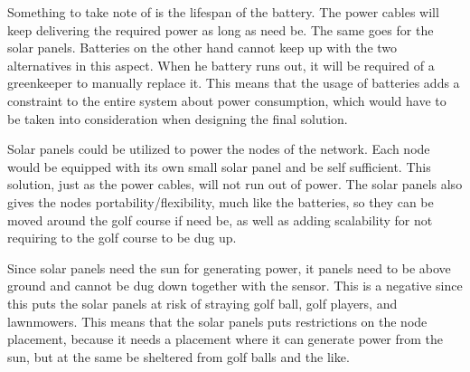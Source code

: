 Something to take note of is the lifespan of the battery. The power cables will keep delivering the required power as long as need be. The same goes for the solar panels. Batteries on the other hand cannot keep up with the two alternatives in this aspect. When he battery runs out, it will be required of a greenkeeper to manually replace it. This means that the usage of batteries adds a constraint to the entire system about power consumption, which would have to be taken into consideration when designing the final solution.

Solar panels could be utilized to power the nodes of the network. Each node would be equipped with its own small solar panel and be self sufficient. This solution, just as the power cables, will not run out of power. The solar panels also gives the nodes portability/flexibility, much like the batteries, so they can be moved around the golf course if need be, as well as adding scalability for not requiring to the golf course to be dug up.

Since solar panels need the sun for generating power, it panels need to be above ground and cannot be dug down together with the sensor. This is a negative since this puts the solar panels at risk of straying golf ball, golf players, and lawnmowers. This means that the solar panels puts restrictions on the node placement, because it needs a placement where it can generate power from the sun, but at the same be sheltered from golf balls and the like.
